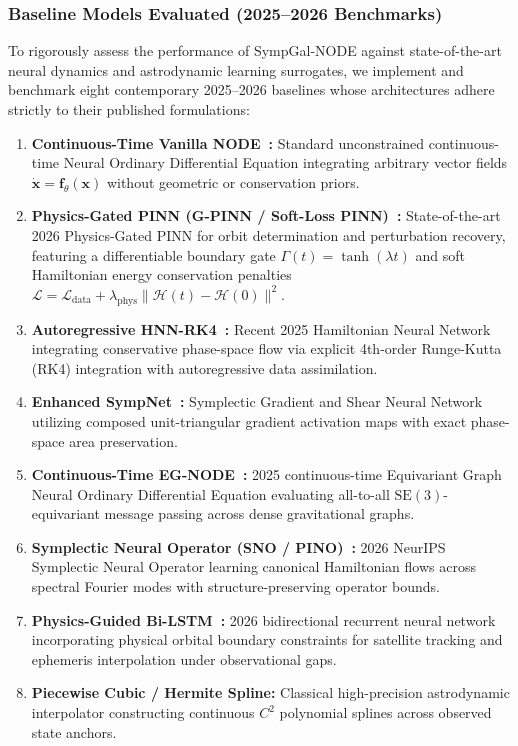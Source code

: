 \documentclass[preprint,12pt,3p]{elsarticle}
\begin{document}
\subsubsection{Baseline Models Evaluated (2025--2026 Benchmarks)}
To rigorously assess the performance of SympGal-NODE against state-of-the-art neural dynamics and astrodynamic learning surrogates, we implement and benchmark eight contemporary 2025--2026 baselines whose architectures adhere strictly to their published formulations:
\begin{enumerate}
    \item \textbf{Continuous-Time Vanilla NODE~\cite{chen2018neural}:} Standard unconstrained continuous-time Neural Ordinary Differential Equation integrating arbitrary vector fields $\dot{\bm{x}} = \bm{f}_{\theta}(\bm{x})$ without geometric or conservation priors.
    \item \textbf{Physics-Gated PINN (G-PINN / Soft-Loss PINN)~\cite{zhang2026gatedpinn}:} State-of-the-art 2026 Physics-Gated PINN for orbit determination and perturbation recovery, featuring a differentiable boundary gate $\Gamma(t) = \tanh(\lambda t)$ and soft Hamiltonian energy conservation penalties $\mathcal{L} = \mathcal{L}_{\mathrm{data}} + \lambda_{\mathrm{phys}} \|\mathcal{H}(t) - \mathcal{H}(0)\|^2$.
    \item \textbf{Autoregressive HNN-RK4~\cite{kumar2025autoregressive}:} Recent 2025 Hamiltonian Neural Network integrating conservative phase-space flow via explicit 4th-order Runge-Kutta (RK4) integration with autoregressive data assimilation.
    \item \textbf{Enhanced SympNet~\cite{jin2020sympnets}:} Symplectic Gradient and Shear Neural Network utilizing composed unit-triangular gradient activation maps with exact phase-space area preservation.
    \item \textbf{Continuous-Time EG-NODE~\cite{satorras2025egnode}:} 2025 continuous-time Equivariant Graph Neural Ordinary Differential Equation evaluating all-to-all $\mathrm{SE}(3)$-equivariant message passing across dense gravitational graphs.
    \item \textbf{Symplectic Neural Operator (SNO / PINO)~\cite{makara2026symplectic}:} 2026 NeurIPS Symplectic Neural Operator learning canonical Hamiltonian flows across spectral Fourier modes with structure-preserving operator bounds.
    \item \textbf{Physics-Guided Bi-LSTM~\cite{song2026lstm}:} 2026 bidirectional recurrent neural network incorporating physical orbital boundary constraints for satellite tracking and ephemeris interpolation under observational gaps.
    \item \textbf{Piecewise Cubic / Hermite Spline:} Classical high-precision astrodynamic interpolator constructing continuous $C^2$ polynomial splines across observed state anchors.
\end{enumerate}
\end{document}
